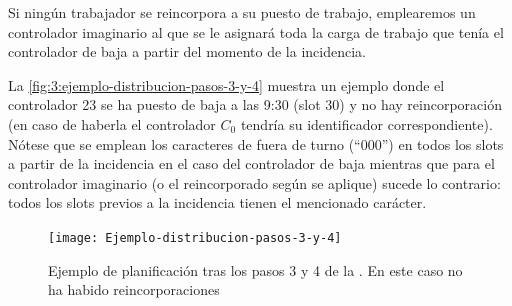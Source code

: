 Si ningún trabajador se reincorpora a su puesto de trabajo, emplearemos un controlador imaginario al que se le asignará toda la carga de trabajo que tenía el controlador de baja a partir del momento de la incidencia.

La \autoref{fig:3:ejemplo-distribucion-pasos-3-y-4} muestra un ejemplo donde el controlador 23 se ha puesto de baja a las 9:30 (slot 30) y no hay reincorporación (en caso de haberla el controlador $C_0$ tendría su identificador correspondiente). Nótese que se emplean los caracteres de fuera de turno (``000'') en todos los slots a partir de la incidencia en el caso del controlador de baja mientras que para el controlador imaginario (o el reincorporado según se aplique) sucede lo contrario: todos los slots previos a la incidencia tienen el mencionado carácter. 


\begin{figure}[htbp]
	\centering
	\texttt{[image: Ejemplo-distribucion-pasos-3-y-4]}
	\caption[Ejemplo de planificación tras los pasos 3 y 4 de la \faseuno{}]{Ejemplo de planificación tras los pasos 3 y 4 de la \faseuno{}. En este caso no ha habido reincorporaciones}
	\label{fig:3:ejemplo-distribucion-pasos-3-y-4}
\end{figure}
%
%
%